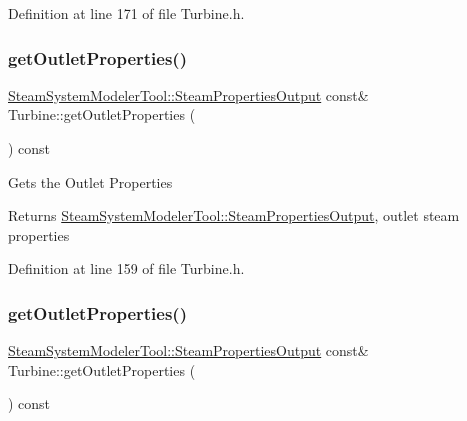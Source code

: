 Definition at line 171 of file Turbine.\+h.

\mbox{\label{class_turbine_aa9449622449e78285a258823ff77c8ec}} 
\subsubsection{\texorpdfstring{get\+Outlet\+Properties()}{getOutletProperties()}\hspace{0.1cm}{\footnotesize\ttfamily [1/3]}}
{\footnotesize\ttfamily \hyperlink{struct_steam_system_modeler_tool_1_1_steam_properties_output}{Steam\+System\+Modeler\+Tool\+::\+Steam\+Properties\+Output} const\& Turbine\+::get\+Outlet\+Properties (\begin{DoxyParamCaption}{ }\end{DoxyParamCaption}) const\hspace{0.3cm}{\ttfamily [inline]}}

Gets the Outlet Properties

\begin{DoxyReturn}{Returns}
\hyperlink{struct_steam_system_modeler_tool_1_1_steam_properties_output}{Steam\+System\+Modeler\+Tool\+::\+Steam\+Properties\+Output}, outlet steam properties 
\end{DoxyReturn}


Definition at line 159 of file Turbine.\+h.

\mbox{\label{class_turbine_aa9449622449e78285a258823ff77c8ec}} 
\subsubsection{\texorpdfstring{get\+Outlet\+Properties()}{getOutletProperties()}\hspace{0.1cm}{\footnotesize\ttfamily [2/3]}}
{\footnotesize\ttfamily \hyperlink{struct_steam_system_modeler_tool_1_1_steam_properties_output}{Steam\+System\+Modeler\+Tool\+::\+Steam\+Properties\+Output} const\& Turbine\+::get\+Outlet\+Properties (\begin{DoxyParamCaption}{ }\end{DoxyParamCaption}) const\hspace{0.3cm}{\ttfamily [inline]}}

